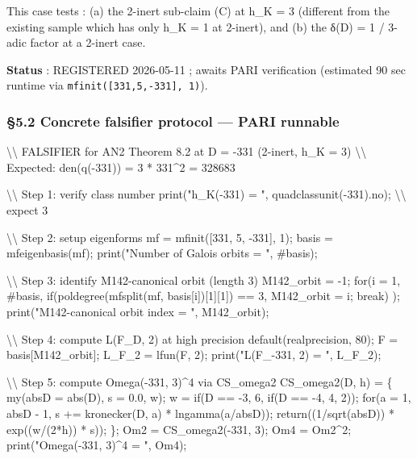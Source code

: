 \documentclass[
  11pt,
  a4paper,
]{article}
\newenvironment{Shaded}{}{}
\newcommand{\NormalTok}[1]{#1}
\begin{document}
This case tests : (a) the 2-inert sub-claim (C) at h\_K = 3 (different from the existing sample which has only h\_K = 1 at 2-inert), and (b) the δ(D) = 1 / 3-adic factor at a 2-inert case.

\textbf{Status} : REGISTERED 2026-05-11 ; awaits PARI verification (estimated 90 sec runtime via \texttt{mfinit({[}331,5,-331{]},\ 1)}).

\hypertarget{concrete-falsifier-protocol-pari-runnable}{%
\subsubsection{§5.2 Concrete falsifier protocol --- PARI runnable}\label{concrete-falsifier-protocol-pari-runnable}}

\begin{Shaded}
\begin{Highlighting}[]
\NormalTok{\textbackslash{}\textbackslash{} FALSIFIER for AN2 Theorem 8.2 at D = {-}331 (2{-}inert, h\_K = 3)}
\NormalTok{\textbackslash{}\textbackslash{} Expected: den(q({-}331)) = 3 * 331\^{}2 = 328683}

\NormalTok{\textbackslash{}\textbackslash{} Step 1: verify class number}
\NormalTok{print("h\_K({-}331) = ", quadclassunit({-}331).no);  \textbackslash{}\textbackslash{} expect 3}

\NormalTok{\textbackslash{}\textbackslash{} Step 2: setup eigenforms}
\NormalTok{mf = mfinit([331, 5, {-}331], 1);}
\NormalTok{basis = mfeigenbasis(mf);}
\NormalTok{print("Number of Galois orbits = ", \#basis);}

\NormalTok{\textbackslash{}\textbackslash{} Step 3: identify M142{-}canonical orbit (length 3)}
\NormalTok{M142\_orbit = {-}1;}
\NormalTok{for(i = 1, \#basis,}
\NormalTok{  if(poldegree(mfsplit(mf, basis[i])[1][1]) == 3, M142\_orbit = i; break)}
\NormalTok{);}
\NormalTok{print("M142{-}canonical orbit index = ", M142\_orbit);}

\NormalTok{\textbackslash{}\textbackslash{} Step 4: compute L(F\_D, 2) at high precision}
\NormalTok{default(realprecision, 80);}
\NormalTok{F = basis[M142\_orbit];}
\NormalTok{L\_F\_2 = lfun(F, 2);}
\NormalTok{print("L(F\_{-}331, 2) = ", L\_F\_2);}

\NormalTok{\textbackslash{}\textbackslash{} Step 5: compute Omega({-}331, 3)\^{}4 via CS\_omega2}
\NormalTok{CS\_omega2(D, h) = \{}
\NormalTok{  my(absD = abs(D), s = 0.0, w);}
\NormalTok{  w = if(D == {-}3, 6, if(D == {-}4, 4, 2));}
\NormalTok{  for(a = 1, absD {-} 1, s += kronecker(D, a) * lngamma(a/absD));}
\NormalTok{  return((1/sqrt(absD)) * exp((w/(2*h)) * s));}
\NormalTok{\};}
\NormalTok{Om2 = CS\_omega2({-}331, 3);}
\NormalTok{Om4 = Om2\^{}2;}
\NormalTok{print("Omega({-}331, 3)\^{}4 = ", Om4);}


\end{Highlighting}
\end{Shaded}
\end{document}
